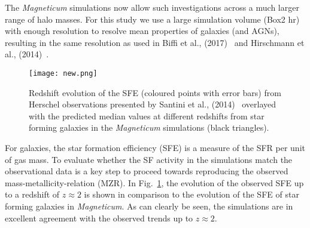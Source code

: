 \documentclass[galaxies,letter,accept,moreauthors,pdftex,10pt,a4paper,usenatbib]{mdpi}
\begin{document}
The {\it Magneticum} simulations now allow such investigations across
a much larger range of halo masses. For this study we use a large
simulation volume (Box2 hr) with enough resolution to resolve mean
properties of galaxies (and AGNs), resulting in the same resolution as
used in Biffi et al., (2017)~\cite{Biffi2017} and Hirschmann et al.,
(2014)~\cite{Hirschmann}.
\begin{figure}[t]
\begin{center}
  \texttt{[image: new.png]}
  \caption{Redshift evolution of the SFE (coloured points with error
    bars) from Herschel observations presented by Santini et al.,
    (2014)~\cite{santini13} overlayed with the predicted median values
    at different redshifts from star forming galaxies in the {\it
      Magneticum} simulations (black triangles).  }
   \label{fig2}
\end{center}
\end{figure}
For galaxies, the star formation efficiency (SFE) is a measure of the
SFR per unit of gas mass. To evaluate whether the SF activity in the
simulations match the observational data is a key step to proceed
towards reproducing the observed mass-metallicity-relation (MZR). In
Fig.~\ref{fig2}, the evolution of the observed SFE up to a redshift of
$z\approx2$ is shown in comparison to the evolution of the SFE of star
forming galaxies in {\it Magneticum}. As can clearly be seen, the
simulations are in excellent agreement with the observed trends up to
$z\approx2$.

\end{document}
